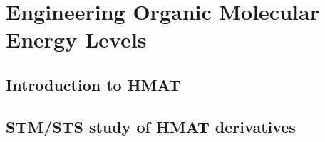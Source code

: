 
\chapter{Engineering Organic Molecular Energy Levels}
\label{ch:oled}



\section{Introduction to HMAT}


\section{\ac{STM}/\ac{STS} study of HMAT derivatives}



\




